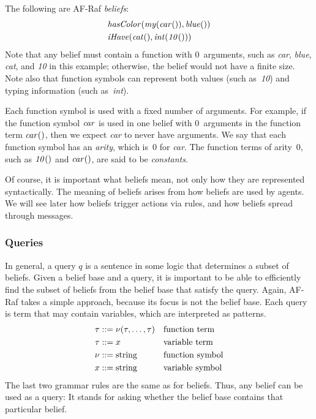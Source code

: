 \documentclass[a4paper,12pt,oneside,fleqn]{book} %
\begin{document}
\begin{example}
The following are AF-Raf \emph{beliefs}:
\begin{align}
&{\it hasColor}({\it my}({\it car}()), {\it blue}()) \\
&{\it iHave}({\it cat}(), {\it int}({\it 10}()))
\end{align}
Note that any belief must contain a function with $0$~arguments, such as
{\it car}, {\it blue}, {\it cat}, and {\it 10\/} in this example;
otherwise, the belief would not have a finite size.  Note also that
function symbols can represent both values (such as~{\it 10\/}) and typing
information (such as~{\it int\/}).
\end{example}

Each function symbol is used with a fixed number of arguments.  For
example, if the function symbol ${\it car}$ is used in one belief with
$0$~arguments in the function term ${\it car}()$, then we expect {\it
car\/} to never have arguments.  We say that each function symbol has an
\emph{arity}, which is~$0$ for {\it car}.  The function terms of arity~$0$,
such as ${\it 10}()$ and ${\it car}()$, are said to be \emph{constants}.

\begin{remark}
Of course, it is important what beliefs mean, not only how they are
represented syntactically.  The meaning of beliefs arises from how beliefs
are used by agents.  We will see later how beliefs trigger actions via
rules, and how beliefs spread through messages.
\end{remark}

\subsubsection{Queries}

In general, a query $q$ is a sentence in some logic that determines a
subset of beliefs.  Given a belief base and a query, it is important to be
able to efficiently find the subset of beliefs from the belief base that
satisfy the query.  Again, AF-Raf takes a simple approach, because its
focus is not the belief base.  Each query is term that may contain
variables, which are interpreted as patterns.  \begin{align} \tau &::=
\nu(\tau,\ldots,\tau) && \text{function term} \\ \tau &::= x &&
\text{variable term} \\ \nu  &::= {\rm string} &&\text{function symbol} \\
x &::= {\rm string} && \text{variable symbol} \end{align} The last two
grammar rules are the same as for beliefs.  Thus, any belief can be used as
a query:  It stands for asking whether the belief base contains that
particular belief.
\end{document}
